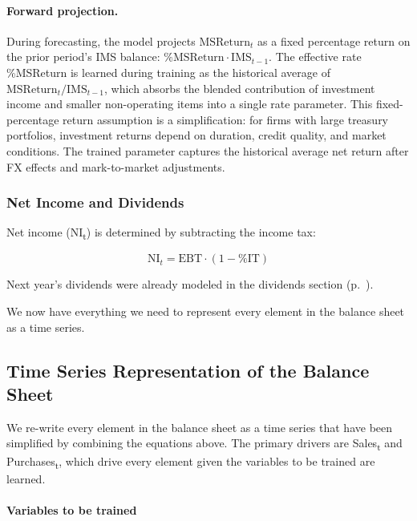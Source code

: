 \documentclass[12pt,a4paper]{article}
\begin{document}
\paragraph{Forward projection.}
During forecasting, the model projects $\text{MSReturn}_t$ as a fixed
percentage return on the prior period's IMS balance:
$\text{\%MSReturn} \cdot \text{IMS}_{t-1}$.  The effective rate
\%MSReturn is learned during training as the historical average of
$\text{MSReturn}_t / \text{IMS}_{t-1}$, which absorbs the blended
contribution of investment income and smaller non-operating items into a
single rate parameter. This fixed-percentage return assumption is a simplification: for firms with large treasury portfolios, investment returns depend on duration, credit quality, and market conditions. The trained parameter captures the historical average net return after FX effects and mark-to-market adjustments.

\subsubsection{Net Income and Dividends}

Net income (NI\textsubscript{t}) is determined by subtracting the income
tax:

\begin{equation}\label{eq:net_income}
\text{NI}_t = \text{EBT} \cdot (1 - \text{\%IT})
\end{equation}

Next year's dividends were already modeled in the dividends section (p.~\pageref{sec:dividends}).

We now have everything we need to represent every element in the balance
sheet as a time series.

\subsection{Time Series Representation of the Balance Sheet}

We re-write every element in the balance sheet as a time series that
have been simplified by combining the equations above. The primary
drivers are Sales\textsubscript{t} and Purchases\textsubscript{t}, which
drive every element given the variables to be trained are learned.

\paragraph{Variables to be trained}
\end{document}
